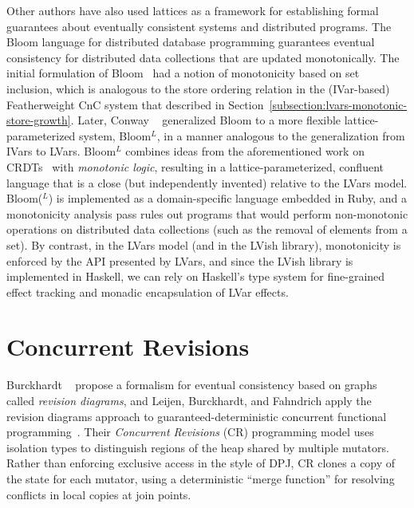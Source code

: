 Other authors have also used lattices as a framework for establishing
formal guarantees about eventually consistent systems and distributed
programs.  The Bloom language for distributed database programming
guarantees eventual consistency for distributed data collections that
are updated monotonically.  The initial formulation of
Bloom~\cite{bloom-cidr} had a notion of monotonicity based on set
inclusion, which is analogous to the store ordering relation in the
(IVar-based) Featherweight CnC system that  described in
Section~\ref{subsection:lvars-monotonic-store-growth}.  Later, Conway
\etal~ generalized Bloom to a more flexible
lattice-parameterized system, Bloom$^L$, in a manner analogous to the
generalization from IVars to LVars.  Bloom$^L$ combines ideas from the
aforementioned work on CRDTs~\cite{crdts, crdts-tr} with
\emph{monotonic logic}, resulting in a lattice-parameterized,
confluent language that is a close (but independently invented)
relative to the LVars model.  Bloom($^L$) is implemented as a
domain-specific language embedded in Ruby, and a monotonicity analysis
pass rules out programs that would perform non-monotonic operations on
distributed data collections (such as the removal of elements from a
set).  By contrast, in the LVars model (and in the LVish library),
monotonicity is enforced by the API presented by LVars, and since the
LVish library is implemented in Haskell, we can rely on Haskell's type
system for fine-grained effect tracking and monadic encapsulation of
LVar effects.

\section{Concurrent Revisions}

Burckhardt \etal~
propose a formalism for eventual consistency based on graphs called
\emph{revision diagrams}, and Leijen, Burckhardt, and Fahndrich apply
the revision diagrams approach to guaranteed-deterministic concurrent
functional programming~.
Their \emph{Concurrent Revisions} (CR) programming model uses
isolation types to distinguish regions of the heap shared by multiple
mutators.  Rather than enforcing exclusive access in the style of DPJ,
CR clones a copy of the state for each mutator, using a deterministic
``merge function'' for resolving conflicts in local copies at join
points.

